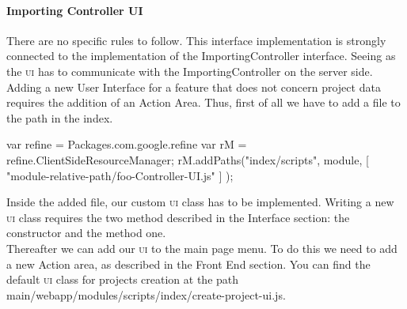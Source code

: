 \paragraph{Importing Controller UI} There are no specific rules to follow. This interface implementation is strongly connected to the implementation of the ImportingController interface. Seeing as the \textsc{ui} has to communicate with the ImportingController on the server side. Adding a new User Interface for a feature that does not concern project data requires the addition of an Action Area. Thus, first of all we have to add a file to the path in the index. 
\begin{code}
var refine = Packages.com.google.refine
var rM = refine.ClientSideResourceManager;
rM.addPaths("index/scripts", module, 
         [ "module-relative-path/foo-Controller-UI.js" ] );
\end{code}
Inside the added file, our custom \textsc{ui} class has to be implemented. Writing a new \textsc{ui} class requires the two method described in the Interface section: the constructor and the  method one. \\
Thereafter we can add our \textsc{ui} to the main page menu. To do this we need to add a new Action area, as described in the Front End section. You can find the default \textsc{ui} class for projects creation at the path \textsf{main/webapp/modules/scripts/index/create-project-ui.js}. 

